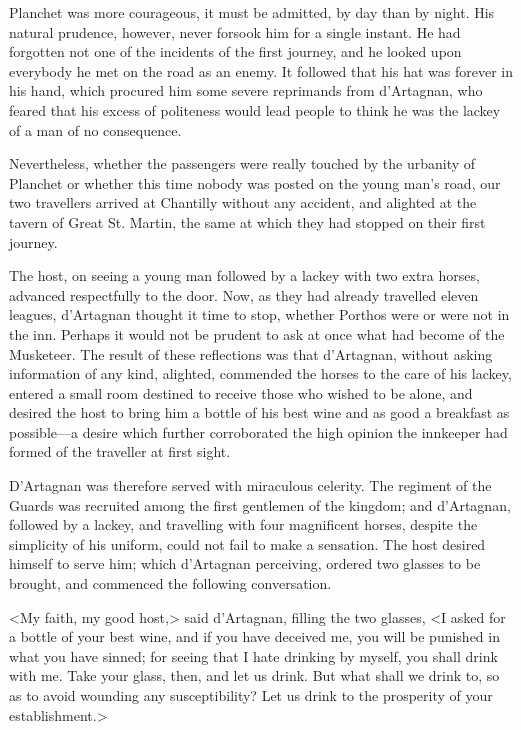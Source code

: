Planchet was more courageous, it must be admitted, by day than by night. His natural prudence, however, never forsook him for a single instant. He had forgotten not one of the incidents of the first journey, and he looked upon everybody he met on the road as an enemy. It followed that his hat was forever in his hand, which procured him some severe reprimands from d'Artagnan, who feared that his excess of politeness would lead people to think he was the lackey of a man of no consequence. 

Nevertheless, whether the passengers were really touched by the urbanity of Planchet or whether this time nobody was posted on the young man's road, our two travellers arrived at Chantilly without any accident, and alighted at the tavern of Great St. Martin, the same at which they had stopped on their first journey. 

The host, on seeing a young man followed by a lackey with two extra horses, advanced respectfully to the door. Now, as they had already travelled eleven leagues, d'Artagnan thought it time to stop, whether Porthos were or were not in the inn. Perhaps it would not be prudent to ask at once what had become of the Musketeer. The result of these reflections was that d'Artagnan, without asking information of any kind, alighted, commended the horses to the care of his lackey, entered a small room destined to receive those who wished to be alone, and desired the host to bring him a bottle of his best wine and as good a breakfast as possible---a desire which further corroborated the high opinion the innkeeper had formed of the traveller at first sight. 

D'Artagnan was therefore served with miraculous celerity. The regiment of the Guards was recruited among the first gentlemen of the kingdom; and d'Artagnan, followed by a lackey, and travelling with four magnificent horses, despite the simplicity of his uniform, could not fail to make a sensation. The host desired himself to serve him; which d'Artagnan perceiving, ordered two glasses to be brought, and commenced the following conversation. 

<My faith, my good host,> said d'Artagnan, filling the two glasses, <I asked for a bottle of your best wine, and if you have deceived me, you will be punished in what you have sinned; for seeing that I hate drinking by myself, you shall drink with me. Take your glass, then, and let us drink. But what shall we drink to, so as to avoid wounding any susceptibility? Let us drink to the prosperity of your establishment.> 

